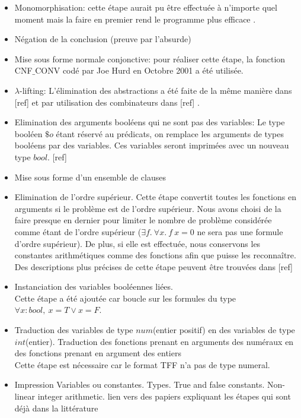 \begin{itemize}    
  \item Monomorphisation: cette étape aurait pu \^etre effectuée à n'importe quel moment mais la faire en premier rend le programme plus efficace \cite{MengP08}.
  \item Négation de la conclusion (preuve par l'absurde)
  \item Mise sous forme normale conjonctive: pour réaliser cette étape, la fonction \textsf{CNF$\_$CONV} codé par Joe Hurd en Octobre 2001 a été utilisée.
  \item $\lambda$-lifting: L'élimination des abstractions a été faite de la m\^eme manière dans [ref] et par utilisation des combinateurs dans [ref]  . 
  \item Elimination des arguments booléens qui ne sont pas des variables:
  Le type booléen $\$o$ étant réservé au prédicats, on remplace les arguments de types booléens par des variables. Ces variables seront imprimées avec un nouveau type $bool$.
  [ref]   
  \item Mise sous forme d'un ensemble de clauses     
  \item Elimination de l'ordre supérieur.
  Cette étape convertit toutes les fonctions en arguments si le problème est de l'ordre supérieur. Nous avons choisi de la faire presque en dernier pour limiter le nombre de problème considérée comme étant de l'ordre supérieur ($\exists f.\ \forall x.\ f\ x = 0$ ne sera pas une formule d'ordre supérieur). De plus, si elle est effectuée, nous conservons les constantes arithmétiques comme des fonctions afin que \beagle puisse les reconna\^itre. Des descriptions plus précises de cette étape peuvent \^etre trouvées dans [ref]

  \item Instanciation des variables booléennes liées.
  \\Cette étape a été ajoutée car \beagle boucle sur les formules du type $\forall x:bool,\ x = T \vee x = F$.
  \item Traduction des variables de type $num$(entier positif) en des variables de type $int$(entier). Traduction des fonctions prenant en arguments des numéraux en des fonctions prenant en argument des entiers
  \\Cette étape est nécessaire car le format TFF n'a pas de type numeral.
\end{itemize}  


\begin{itemize}
    \item Impression
    \subitem Variables ou constantes.  
    \subitem Types.
    \subitem True and false constants.
    \subitem Non-linear integer arithmetic.
lien vers des papiers expliquant les étapes qui sont déjà dans la
  littérature
\end{itemize}  

